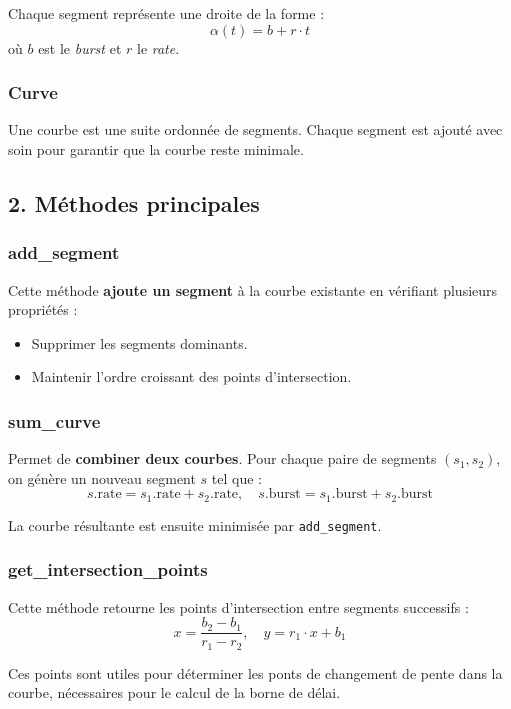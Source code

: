 \documentclass[12pt]{report}
\begin{document}
Chaque segment représente une droite de la forme :
\[
\alpha(t) = b + r \cdot t
\]
où $b$ est le \textit{burst} et $r$ le \textit{rate}.

\subsubsection*{Curve}

Une courbe est une suite ordonnée de segments.
Chaque segment est ajouté avec soin pour garantir que la courbe 
reste minimale.

\subsection*{2. Méthodes principales}

\subsubsection*{add\_segment}

Cette méthode \textbf{ajoute un segment} à la courbe existante en vérifiant plusieurs propriétés :

\begin{itemize}
  \item Supprimer les segments dominants.
  \item Maintenir l'ordre croissant des points d'intersection.
\end{itemize}

\subsubsection*{sum\_curve}

Permet de \textbf{combiner deux courbes}. Pour chaque paire de segments $(s_1, s_2)$, on génère un nouveau segment $s$ tel que :
\[
s.\text{rate} = s_1.\text{rate} + s_2.\text{rate}, \quad
s.\text{burst} = s_1.\text{burst} + s_2.\text{burst}
\]

La courbe résultante est ensuite minimisée par \texttt{add\_segment}.

\subsubsection*{get\_intersection\_points}

Cette méthode retourne les points d'intersection entre segments successifs :
\[
x = \frac{b_2 - b_1}{r_1 - r_2}, \quad
y = r_1 \cdot x + b_1
\]

Ces points sont utiles pour déterminer les ponts de changement
de pente dans la courbe, nécessaires pour le calcul de la borne de délai.
\end{document}
